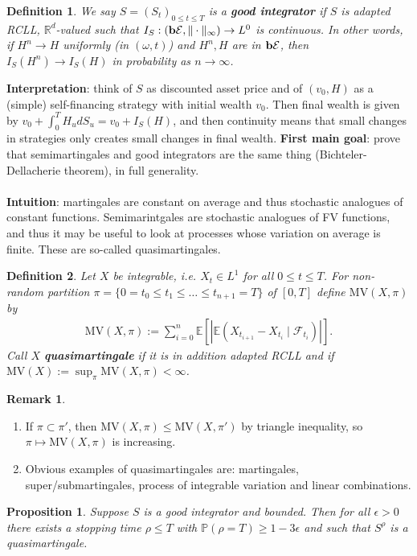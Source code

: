\documentclass[12pt,a4paper, twoside]{article}
\newtheorem{prop}{Proposition}[section]
\newtheorem{defn}{Definition}[section]
\theoremstyle{definition}
\newtheorem{rem}{Remark}[section]
\newcommand{\EE}{\mathbb{E}} %
\newcommand{\PP}{\mathbb{P}} %
\newcommand{\simple}{\textbf{\text{b}}\mathcal{E}}
\newcommand{\MV}{\text{MV}}
\begin{document}
\begin{defn} We say $S=(S_t)_{0 \leq t \leq T}$ is a \textbf{good integrator} if $S$ is adapted RCLL, $\mathbb{R}^d$-valued such that $I_S: ( \simple, \| \cdot \|_\infty) \to L^0$ is continuous. In other words, if $H^n \to H$ uniformly (in $(\omega, t)$) and $H^n, H$ are in $\simple$, then $I_S(H^n) \to I_S(H)$ in probability as $n \to \infty$. 
\end{defn}
\noindent \textbf{Interpretation}: think of $S$ as discounted asset price and of $(v_0, H)$ as a (simple) self-financing strategy with initial wealth $v_0$. Then final wealth is given by $v_0 + \int_0^T H_u dS_u = v_0 + I_S(H)$, and then continuity means that small changes in strategies only creates small changes in final wealth. 
\newpage
\noindent \textbf{First main goal}: prove that semimartingales and good integrators are the same thing (Bichteler-Dellacherie theorem), in full generality. 
\\\\
\textbf{Intuition}: martingales are constant on average and thus stochastic analogues of constant functions. Semimarintgales are stochastic analogues of FV functions, and thus it may be useful to look at processes whose variation on average is finite. These are so-called quasimartingales. 
\begin{defn} Let $X$ be integrable, i.e. $X_t \in L^1$ for all $0 \leq t \leq T$. For non-random partition $\pi = \{0 =t_0 \leq t_1 \leq \dots \leq t_{n+1} = T\}$ of $[0,T]$ define $\MV(X, \pi)$ by 
\begin{align*}
\MV(X, \pi) := \sum_{i=0}^n \EE[|\EE(X_{t_{i+1}}-X_{t_i} \mid \mathcal{F}_{t_i}) | ].
\end{align*}
Call $X$ \textbf{quasimartingale} if it is in addition adapted RCLL and if $\MV(X):= \sup_\pi \MV(X, \pi ) < \infty$. 
\end{defn} 
\begin{rem} \
\begin{enumerate}
\item If $\pi \subset \pi'$, then $\MV( X, \pi) \leq \MV(X, \pi')$ by triangle inequality, so $\pi \mapsto \MV(X, \pi)$ is increasing. 
\item Obvious examples of quasimartingales are: martingales, super/submartingales, process of integrable variation and linear combinations. 
\end{enumerate}
\end{rem}
\begin{prop} \label{P21} Suppose $S$ is a good integrator and bounded. Then for all $\epsilon >0$ there exists a stopping time $\rho \leq T$ with $\PP( \rho = T) \geq 1-3 \epsilon$ and such that $S^\rho$ is a quasimartingale. 
\end{prop}
\end{document}
